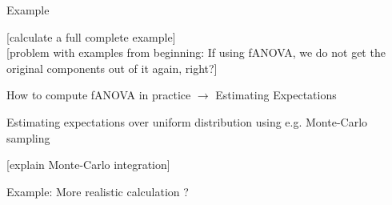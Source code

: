 \documentclass[11pt,compress,t,notes=noshow, aspectratio=169, xcolor=table]{beamer}
\begin{document}
\begin{frame}{Example}

    [calculate a full complete example] \\
    
    [problem with examples from beginning: If using fANOVA, we do not get the original components out of it again, right?]
    
\end{frame}

\begin{frame}{How to compute fANOVA in practice $\rightarrow$ Estimating Expectations}

    Estimating expectations over uniform distribution using e.g. Monte-Carlo sampling

    [explain Monte-Carlo integration]
    
\end{frame}

\begin{frame}{Example: More realistic calculation ?}
    
\end{frame}
\end{document}
